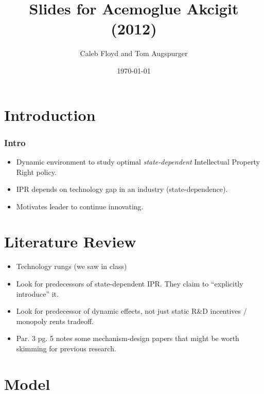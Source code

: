 \documentclass{beamer}
\title{Slides for Acemoglue Akcigit (2012)}
\author{Caleb Floyd and Tom Augspurger}
\date{\today}
\begin{document}
\frame{\titlepage}

\section[Outline]{}
\frame{\tableofcontents}




\section{Introduction}
\label{sec:introduction}

\begin{frame}[t]\frametitle{Intro}
  \begin{itemize}
    \item Dynamic environment to study optimal \emph{state-dependent} Intellectual Property Right policy.
    \item IPR depends on technology gap in an industry (state-dependence).
    \item Motivates leader to continue innovating.
  \end{itemize}
\end{frame}

\section{Literature Review}
\label{sec:literature_review}
  \begin{itemize}
    \item Technology rungs (we saw in class)
    \item Look for predecessors of state-dependent IPR.  They claim to ``explicitly introduce'' it.
    \item Look for predecessor of dynamic effects, not just static R\&D incentives / monopoly rents tradeoff.
    \item Par. 3 pg. 5 notes some mechanism-design papers that might be worth skimming for previous research.
  \end{itemize}


\section{Model}
\label{sec:model}
\end{document}

